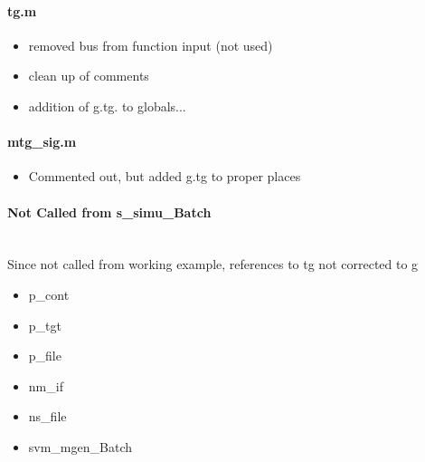 \documentclass[12pt]{article}
\begin{document}
\paragraph{tg.m}
	\begin{itemize}
		\item removed bus from function input (not used)
		\item clean up of comments
		\item addition of g.tg. to globals...
	\end{itemize}

\paragraph{mtg\_sig.m}
	\begin{itemize}
		\item Commented out, but added g.tg to proper places
	\end{itemize}

\paragraph{Not Called from s\_simu\_Batch } \ \\
Since not called from working example, references to tg not corrected to g
	\begin{itemize}
		\item p\_cont
		\item p\_tgt
		\item p\_file
		\item nm\_if
		\item ns\_file
		\item svm\_mgen\_Batch
	\end{itemize}
\end{document}
